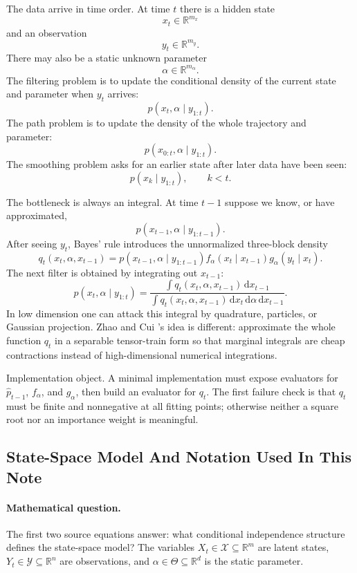 \documentclass[11pt]{article}
\numberwithin{equation}{section}
\newcommand{\R}{\mathbb R}
\newcommand{\dd}{\,\mathrm d}
\begin{document}
The data arrive in time order.  At time \(t\) there is a hidden state
\[
    x_t\in \R^{m_x}
\]
and an observation
\[
    y_t\in \R^{m_y}.
\]
There may also be a static unknown parameter
\[
    \alpha\in \R^{m_\alpha}.
\]
The filtering problem is to update the conditional density of the current state
and parameter when \(y_t\) arrives:
\[
    p(x_t,\alpha\mid y_{1:t}).
\]
The path problem is to update the density of the whole trajectory and parameter:
\[
    p(x_{0:t},\alpha\mid y_{1:t}).
\]
The smoothing problem asks for an earlier state after later data have been seen:
\[
    p(x_k\mid y_{1:t}),\qquad k<t.
\]

The bottleneck is always an integral.  At time \(t-1\) suppose we know, or have
approximated,
\[
    p(x_{t-1},\alpha\mid y_{1:t-1}).
\]
After seeing \(y_t\), Bayes' rule introduces the unnormalized three-block
density
\[
    q_t(x_t,\alpha,x_{t-1})
    =
    p(x_{t-1},\alpha\mid y_{1:t-1})
    f_\alpha(x_t\mid x_{t-1})
    g_\alpha(y_t\mid x_t).
\]
The next filter is obtained by integrating out \(x_{t-1}\):
\[
    p(x_t,\alpha\mid y_{1:t})
    =
    \frac{\int q_t(x_t,\alpha,x_{t-1})\dd x_{t-1}}
    {\int q_t(x_t,\alpha,x_{t-1})\dd x_t\dd\alpha\dd x_{t-1}}.
\]
In low dimension one can attack this integral by quadrature, particles, or
Gaussian projection.  Zhao and Cui \cite{zhao2024ttsequential}'s idea is different: approximate the whole
function \(q_t\) in a separable tensor-train form so that marginal integrals are
cheap contractions instead of high-dimensional numerical integrations.

Implementation object.  A minimal implementation must expose evaluators for
\(\widehat p_{t-1}\), \(f_\alpha\), and \(g_\alpha\), then build an evaluator
for \(q_t\).  The first failure check is that \(q_t\) must be finite and
nonnegative at all fitting points; otherwise neither a square root nor an
importance weight is meaningful.

\subsection{State-Space Model And Notation Used In This Note}

\paragraph{Mathematical question.}
The first two source equations answer: what conditional independence structure
defines the state-space model?  The variables \(X_t\in\mathcal X\subseteq\R^m\)
are latent states, \(Y_t\in\mathcal Y\subseteq\R^n\) are observations, and
\(\alpha\in\Theta\subseteq\R^d\) is the static parameter.
\end{document}
